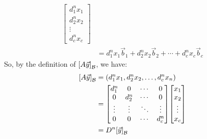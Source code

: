 \documentclass[11pt, letterpaper]{report}
\newenvironment{notes}{}{}
\newenvironment{book}{}{}
\let\originalleft\left
\let\originalright\right
\renewcommand{\left}{\mathopen{}\mathclose\bgroup\originalleft}
\renewcommand{\right}{\aftergroup\egroup\originalright}
\begin{document}
\begin{book}
\begin{align*}
\begin{bmatrix}
d_1^nx_1 \\ d_2^nx_2 \\ \vdots \\ d_c^nx_c 
\end{bmatrix} \\
&= d_1^nx_1\vec{b}_1 + d_2^nx_2\vec{b}_2 + \cdots + d_c^nx_c\vec{b}_c
\end{align*}
So, by the definition of $\left[ A\vec{y} \right]_{\mathcal{B}}$, we have:
\begin{align*}
\left[ A\vec{y} \right]_{\mathcal{B}} &=  ( d_1^nx_1, d_2^nx_2, \ldots, d_c^nx_n ) \\
&= \begin{bmatrix}
d_1^n & 0 & \cdots & 0 \\
0 & d_2^n & \cdots & 0 \\
\vdots & \vdots & \ddots & \vdots \\
0 & 0 & \cdots & d_c^n
\end{bmatrix} \begin{bmatrix}
x_1 \\ x_2 \\ \vdots \\ x_c
\end{bmatrix} \\
&= D^n \left[ \vec{y} \right]_{\mathcal{B}}
\end{align*}
\blacksquare
\end{book}

\begin{notes}
\vfill
\vfill
\newpage
\end{notes}
\end{document}
